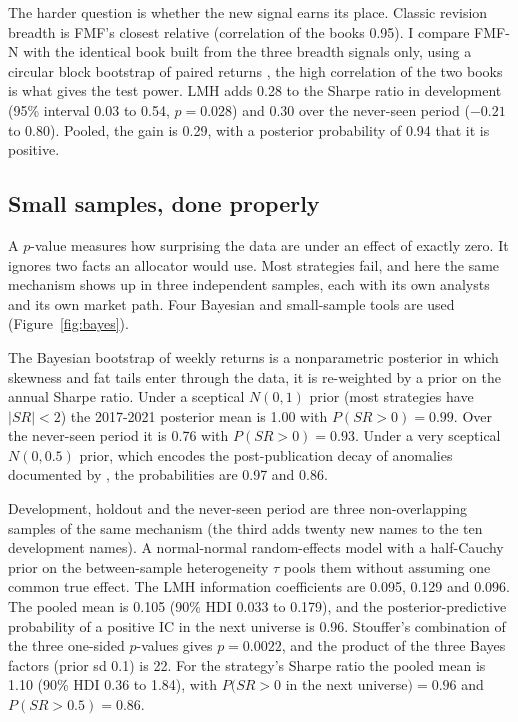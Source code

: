 The harder question is whether the new signal earns its place. Classic revision breadth is FMF's closest relative (correlation of the books 0.95). I compare FMF-N with the identical book built from the three breadth signals only, using a circular block bootstrap of paired returns \citep{ledoit2008}, the high correlation of the two books is what gives the test power. LMH adds 0.28 to the Sharpe ratio in development (95\% interval 0.03 to 0.54, $p = 0.028$) and 0.30 over the never-seen period ($-0.21$ to 0.80). Pooled, the gain is 0.29, with a posterior probability of 0.94 that it is positive.

\subsection{Small samples, done properly}\label{sec:bayes}

A $p$-value measures how surprising the data are under an effect of exactly zero. It ignores two facts an allocator would use. Most strategies fail, and here the same mechanism shows up in three independent samples, each with its own analysts and its own market path. Four Bayesian and small-sample tools are used (Figure~\ref{fig:bayes}).

 The Bayesian bootstrap \citep{rubin1981} of weekly returns is a nonparametric posterior in which skewness and fat tails enter through the data, it is re-weighted by a prior on the annual Sharpe ratio. Under a sceptical $N(0,1)$ prior (most strategies have $|SR|<2$) the 2017-2021 posterior mean is 1.00 with $P(SR>0)=0.99$. Over the never-seen period it is 0.76 with $P(SR>0)=0.93$. Under a very sceptical $N(0,0.5)$ prior, which encodes the post-publication decay of anomalies documented by \citet{mclean2016}, the probabilities are 0.97 and 0.86.

 Development, holdout and the never-seen period are three non-overlapping samples of the same mechanism (the third adds twenty new names to the ten development names). A normal-normal random-effects model with a half-Cauchy prior on the between-sample heterogeneity $\tau$ \citep{gelman2006} pools them without assuming one common true effect. The LMH information coefficients are 0.095, 0.129 and 0.096. The pooled mean is 0.105 (90\% HDI 0.033 to 0.179), and the posterior-predictive probability of a positive IC in the next universe is 0.96. Stouffer's combination of the three one-sided $p$-values gives $p = 0.0022$, and the product of the three Bayes factors (prior sd 0.1) is 22. For the strategy's Sharpe ratio the pooled mean is 1.10 (90\% HDI 0.36 to 1.84), with $P(SR>0$ in the next universe$)=0.96$ and $P(SR>0.5)=0.86$.

